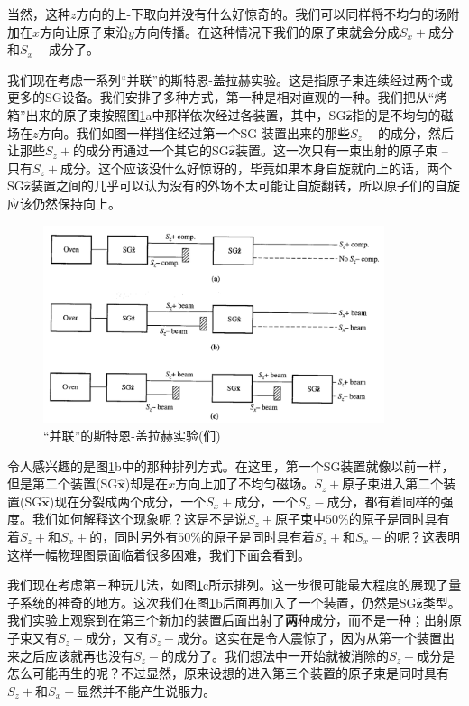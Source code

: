 \documentclass[UTF8,twoside]{ctexart}
\begin{document}
当然，这种$z$方向的上-下取向并没有什么好惊奇的。我们可以同样将不均匀的场附加在$x$方向让原子束沿$y$方向传播。在这种情况下我们的原子束就会分成$S_x+$成分和$S_x-$成分了。\\


\noindent 我们现在考虑一系列“并联”的斯特恩-盖拉赫实验。这是指原子束连续经过两个或更多的SG设备。我们安排了多种方式，第一种是相对直观的一种。我们把从“烤箱”出来的原子束按照图{\ref{Fig1.3}}a中那样依次经过各装置，其中，SG${\hat{\bm z}}$指的是不均匀的磁场在$z$方向。我们如图一样挡住经过第一个SG 装置出来的那些$S_z-$的成分，然后让那些$S_z+$的成分再通过一个其它的SG${\hat{\bm z}}$装置。这一次只有一束出射的原子束 -- 只有$S_z+$成分。这个应该没什么好惊讶的，毕竟如果本身自旋就向上的话，两个SG$\hat{\bm z}$装置之间的几乎可以认为没有的外场不太可能让自旋翻转，所以原子们的自旋应该仍然保持向上。

\begin{figure}
\begin{centering}
\includegraphics[width = 10cm]{./Sakurai/Fig_1.3.png}
\caption{“并联”的斯特恩-盖拉赫实验(们)}
\label {Fig1.3}
\end{centering}
\end{figure}

令人感兴趣的是图{\ref{Fig1.3}}b中的那种排列方式。在这里，第一个SG装置就像以前一样，但是第二个装置(SG$\hat{\bm x}$)却是在$x$方向上加了不均匀磁场。$S_z+$原子束进入第二个装置(SG$\hat{\bm x}$)现在分裂成两个成分，一个$S_x+$成分，一个$S_x-$成分，都有着同样的强度。我们如何解释这个现象呢？这是不是说$S_z+$原子束中$50\%$的原子是同时具有着$S_z+$和$S_x+$的，同时另外有$50\%$的原子是同时具有着$S_z+$和$S_x-$的呢？这表明这样一幅物理图景面临着很多困难，我们下面会看到。

我们现在考虑第三种玩儿法，如图\ref{Fig1.3}c所示排列。这一步很可能最大程度的展现了量子系统的神奇的地方。这次我们在图{\ref{Fig1.3}}b后面再加入了一个装置，仍然是SG$\hat{\bm z}$类型。我们实验上观察到在第三个新加的装置后面出射了{\textbf{两}}种成分，而不是一种；出射原子束又有$S_z+$成分，又有$S_z-$成分。这实在是令人震惊了，因为从第一个装置出来之后应该就再也没有$S_z-$的成分了。我们想法中一开始就被消除的$S_z-$成分是怎么可能再生的呢？不过显然，原来设想的进入第三个装置的原子束是同时具有$S_z+$和$S_x+$显然并不能产生说服力。
\end{document}
